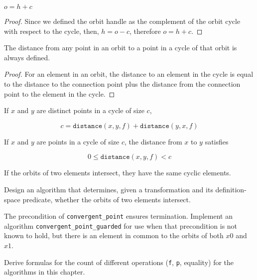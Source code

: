 \begin{lemma}
	$o = h + c$
\end{lemma}

\begin{proof}
	Since we defined the orbit handle as the complement of the orbit cycle with respect
	to the cycle, then, $h = o - c$, therefore $o = h + c$.
\end{proof}

\begin{lemma}
	The distance from any point in an orbit to a point in a cycle
	of that orbit is always defined.
\end{lemma}

\begin{proof}
	For an element in an orbit, the distance to an element in the cycle is equal to the
	distance to the connection point plus the distance from the connection point to the
	element in the cycle.
\end{proof}

\begin{lemma}
	If $x$ and $y$ are distinct points in a cycle of size $c$,
	
	\[ c = \mathtt{distance}(x, y, f) + \mathtt{distance}(y, x, f) \]
\end{lemma}

\begin{lemma}
	If $x$ and $y$ are points in a cycle of size $c$, the distance from $x$
	to $y$ satisfies

	\[ 0 \leq \mathtt{distance}(x, y, f) < c \]
\end{lemma}

\begin{lemma}
	If the orbits of two elements intersect, they have the same
	cyclic elements.
\end{lemma}

\begin{exercise}
	Design an algorithm that determines, given a transformation and its definition-space predicate,
	whether the orbits of two elements intersect.
\end{exercise}

\begin{exercise}
	The precondition of \verb|convergent_point| ensures termination. Implement an algorithm
	\verb|convergent_point_guarded| for use when that precondition is not known to hold, but
	there is an element in common to the orbits of both $x0$ and $x1$.
\end{exercise}

\begin{exercise}
	Derive formulas for the count of different operations (\verb|f|, \verb|p|, equality) for
	the algorithms in this chapter.
\end{exercise}

